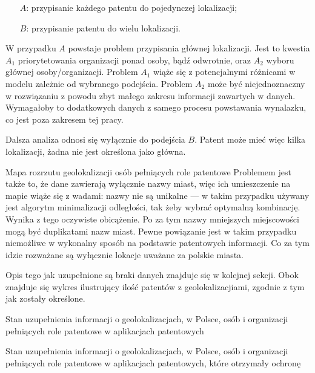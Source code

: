 \begin{enumerate}
\item[$A$:] przypisanie każdego patentu do pojedynczej lokalizacji;
\item[$B$:] przypisanie patentu do wielu lokalizacji.
\end{enumerate}

W przypadku $A$ powstaje problem przypisania głównej lokalizacji.
Jest to kwestia $A_1$ priorytetowania organizacji ponad osoby, bądź
odwrotnie, oraz $A_2$ wyboru głównej osoby/organizacji.
Problem $A_1$ wiąże się z potencjalnymi różnicami w modelu zależnie
od wybranego podejścia. Problem $A_2$ może być niejednoznaczny
w rozwiązaniu z powodu zbyt małego zakresu informacji zawartych w danych.
Wymagałoby to dodatkowych danych z samego procesu powstawania wynalazku,
co jest poza zakresem tej pracy.

Dalsza analiza odnosi się wyłącznie do podejścia $B$.
Patent może mieć więc kilka lokalizacji, żadna nie jest określona jako główna.

{Mapa rozrzutu geolokalizacji osób pełniących role patentowe}
{ Problemem jest także to, że dane zawierają wyłącznie nazwy miast, 
  więc ich umieszczenie na mapie wiąże się z wadami: 
  nazwy nie są unikalne --- w takim przypadku używany jest algorytm minimalizacji 
  odległości, tak żeby wybrać optymalną kombinację. 
  Wynika z tego oczywiste obicążenie. 
  Po za tym nazwy mniejszych miejscowości mogą być duplikatami
  nazw miast. Pewne powiązanie jest w takim przypadku niemożliwe
  w wykonalny sposób na podstawie patentowych informacji.
  Co za tym idzie rozważane są wyłącznie lokacje uważane za polskie miasta. }


\newpage

Opis tego jak uzupełnione są braki danych znajduje się w kolejnej sekcji.
Obok znajduje się wykres ilustrujący ilość patentów z geolokalizacjiami,
zgodnie z tym jak zostały określone.

{ Stan uzupełnienia informacji o geolokalizacjach, w Polsce, 
  osób i organizacji  pełniących role patentowe
  w aplikacjach patentowych}

{ Stan uzupełnienia informacji o geolokalizacjach, w Polsce, 
  osób i organizacji  pełniących role patentowe
  w aplikacjach patentowych, które otrzymały ochronę}

\newpage









